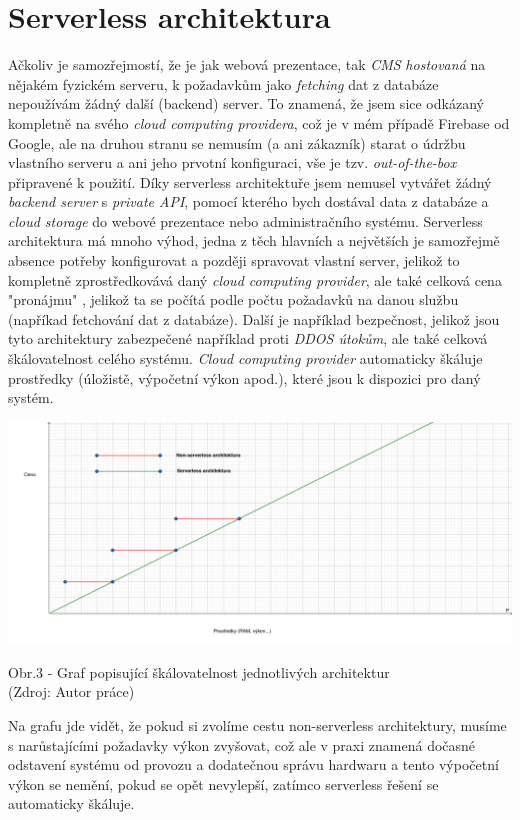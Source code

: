 \documentclass[12pt,a4paper]{report}
\begin{document}
  \section{Serverless architektura}
  Ačkoliv je samozřejmostí, že je jak webová prezentace, tak \emph{CMS} \emph{hostovaná} na nějakém fyzickém
  serveru, k požadavkům jako \emph{fetching} dat z databáze nepoužívám žádný další (backend) server. To
  znamená, že jsem sice odkázaný kompletně na svého \emph{cloud computing providera}, což je v mém
  případě Firebase od Google, ale na druhou stranu se nemusím (a ani zákazník) starat o údržbu
  vlastního serveru a ani jeho prvotní konfiguraci, vše je tzv. \emph{out-of-the-box} připravené k použití.
  Díky serverless architektuře jsem nemusel vytvářet žádný \emph{backend server} s \emph{private API}, pomocí
  kterého bych dostával data z databáze a \emph{cloud storage} do webové prezentace nebo
  administračního systému.
  Serverless architektura má mnoho výhod, jedna z těch hlavních a největších je samozřejmě
  absence potřeby konfigurovat a později spravovat vlastní server, jelikož to kompletně
  zprostředkovává daný \emph{cloud computing provider}, ale také celková cena "pronájmu" , jelikož ta se
  počítá podle počtu požadavků na danou službu (napříkad fetchování dat z databáze). Další je například bezpečnost,
  jelikož jsou tyto architektury zabezpečené například proti \emph{DDOS útokům}, ale také celková
  škálovatelnost celého systému. \emph{Cloud computing provider} automaticky škáluje prostředky (úložistě,
  výpočetní výkon apod.), které jsou k dispozici pro daný systém.

  \vspace*{0.5cm}
  \noindent\includegraphics[width=\linewidth]{non-vs-serverless.png}
  \begin{center}
    Obr.3 - Graf popisující škálovatelnost jednotlivých architektur  \\
    (Zdroj: Autor práce)
  \end{center}
  \vspace*{0.5cm}
  Na grafu jde vidět, že pokud si zvolíme cestu non-serverless architektury, musíme s narůstajícími
  požadavky výkon zvyšovat, což ale v praxi znamená dočasné odstavení systému od provozu a
  dodatečnou správu hardwaru a tento výpočetní výkon se nemění, pokud se opět nevylepší,
  zatímco serverless řešení se automaticky škáluje.
  
\end{document}
